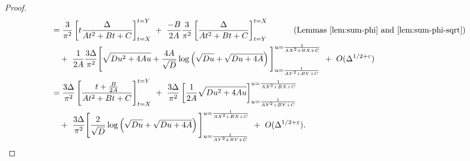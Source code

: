 \documentclass[11pt,letterpaper,reqno]{amsart}
\numberwithin{equation}{section}
\numberwithin{figure}{section}
\numberwithin{table}{section}
\newcommand{\lrp}[1]{\left(#1\right)}
\newcommand{\lrb}[1]{\left[#1\right]}
\begin{document}
\begin{proof}
\begin{align}
    &= \frac{3}{\pi^2} \lrb{ t  \frac{\Delta}{At^2+Bt+C}}_{t=X}^{t=Y} ~+~ \frac{-B}{2A}\frac{3}{\pi^2} \lrb{  \frac{\Delta}{At^2+Bt+C}}_{t=Y}^{t=X} \qquad\quad \text{(Lemmas \ref{lem:sum-phi} and \ref{lem:sum-phi-sqrt})}
    \\
    &\quad +~ \frac{1}{2A} \frac{3\Delta}{\pi^2}\Bigg[ \sqrt{Du^2+4Au} +  \frac{4A}{\sqrt D}
            \log\lrp{
                \sqrt{Du} + \sqrt{Du+4A}
            }
         \Bigg]_{u=\frac{1}{AY^2+BY+C}}^{u=\frac{1}{AX^2+BX+C}} ~+~ O(\Delta^{1/2+\varepsilon}) \\
    &= \frac{3\Delta}{\pi^2} \lrb{ \frac{{t+\frac{B}{2A}}}{At^2+Bt+C}}_{t=X}^{t=Y} 
    ~+~ \frac{3\Delta}{\pi^2} \lrb{
        \frac{1}{2A} \sqrt{Du^2+4Au}
    }_{u=\frac{1}{AY^2+BY+C}}^{u=\frac{1}{AX^2+BX+C}}
    \\
    &\quad +~ \frac{3\Delta}{\pi^2}\Bigg[ 
            \frac{2}{\sqrt D}
            \log\lrp{
                \sqrt{Du} + \sqrt{Du+4A}
            }
         \Bigg]_{u=\frac{1}{AY^2+BY+C}}^{u=\frac{1}{AX^2+BX+C}} ~+~ O(\Delta^{1/2+\varepsilon}). 
\end{align}


\end{proof}
\end{document}
